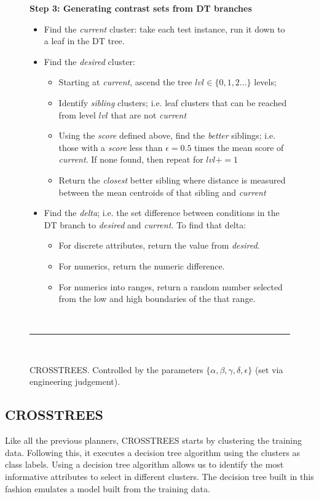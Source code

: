 \documentclass{sig-alternate}
\newcommand{\bi}{\begin{itemize}[leftmargin=0.4cm]}
\newcommand{\ei}{\end{itemize}}
\begin{document}
\begin{figure}[t]
	{\bf Step 3: Generating contrast sets from DT branches}
	\begin{itemize}
		\item Find the {\em current } cluster: take each test instance, run it down to a leaf in the DT tree.  
		\item Find the {\em desired} cluster: 
		\bi
		\item Starting at {\em current}, ascend the tree $lvl\in \{0,1,2...\}$ levels;
		\item Identify {\em sibling} clusters; i.e. leaf clusters that can be reached from level $lvl$ that are not {\em current }
		\item Using the {\em score} defined above, find the {\em better} siblings; i.e. those with a {\em score} less than $\epsilon=0.5$ times the mean score of {\em current}. If none found, then repeat for $lvl += 1$
		\item  Return the {\em closest} better sibling where distance is measured between the mean centroids of that sibling and {\em current}
		\ei
		\item Find the {\em delta}; i.e. the set difference between  conditions in the DT branch to {\em desired} and {\em current}. To find that delta:
		\bi
		\item
		For discrete attributes,  return the value from {\em desired}. 
		\item
		For  numerics, return the numeric difference. 
		\item
		For numerics  into ranges, return a random number selected from the low and high boundaries of the that range.
		\ei
		\ei
		~\hrule~
		\caption{CROSSTREES. Controlled by the parameters
			$\{\alpha, \beta, \gamma, \delta, \epsilon\}$ (set via engineering judgement).}
		\label{fig:xtrees_bare}
	\end{figure}



\subsection{CROSSTREES}



Like all the previous planners, CROSSTREES starts by clustering the training data. Following this, it executes a decision tree algorithm using the clusters as class labels. Using a decision tree algorithm allows us to identify the most informative attributes to select in different clusters. The decision tree built in this fashion emulates a model built from the training data. 
\end{document}

